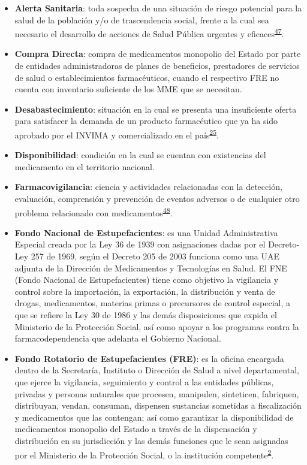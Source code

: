 \documentclass[
]{book}
\begin{document}
\begin{itemize}
\item
  \textbf{Alerta Sanitaria}: toda sospecha de una situación de riesgo potencial para la salud de la población y/o de trascendencia social, frente a la cual sea necesario el desarrollo de acciones de Salud Pública urgentes y eficaces\textsuperscript{\protect\hyperlink{ref-INVIMA2021-ALERTAS}{47}}.
\item
  \textbf{Compra Directa}: compra de medicamentos monopolio del Estado por parte de entidades administradoras de planes de beneficios, prestadores de servicios de salud o establecimientos farmacéuticos, cuando el respectivo FRE no cuenta con inventario suficiente de los MME que se necesitan.
\item
  \textbf{Desabastecimiento}: situación en la cual se presenta una insuficiente oferta para satisfacer la demanda de un producto farmacéutico que ya ha sido aprobado por el INVIMA y comercializado en el país\textsuperscript{\protect\hyperlink{ref-INVIMA2018-Desabast}{25}}.
\item
  \textbf{Disponibilidad}: condición en la cual se cuentan con existencias del medicamento en el territorio nacional.
\item
  \textbf{Farmacovigilancia}: ciencia y actividades relacionadas con la detección, evaluación, comprensión y prevención de eventos adversos o de cualquier otro problema relacionado con medicamentos\textsuperscript{\protect\hyperlink{ref-INVIMA2006-FV}{48}}.
\item
  \textbf{Fondo Nacional de Estupefacientes}: es una Unidad Administrativa Especial creada por la Ley 36 de 1939 con asignaciones dadas por el Decreto-Ley 257 de 1969, según el Decreto 205 de 2003 funciona como una UAE adjunta de la Dirección de Medicamentos y Tecnologías en Salud. El FNE (Fondo Nacional de Estupefacientes) tiene como objetivo la vigilancia y control sobre la importación, la exportación, la distribución y venta de drogas, medicamentos, materias primas o precursores de control especial, a que se refiere la Ley 30 de 1986 y las demás disposiciones que expida el Ministerio de la Protección Social, así como apoyar a los programas contra la farmacodependencia que adelanta el Gobierno Nacional.
\item
  \textbf{Fondo Rotatorio de Estupefacientes (FRE)}: es la oficina encargada dentro de la Secretaría, Instituto o Dirección de Salud a nivel departamental, que ejerce la vigilancia, seguimiento y control a las entidades públicas, privadas y personas naturales que procesen, manipulen, sinteticen, fabriquen, distribuyan, vendan, consuman, dispensen sustancias sometidas a fiscalización y medicamentos que las contengan; así como garantizar la disponibilidad de medicamentos monopolio del Estado a través de la dispensación y distribución en su jurisdicción y las demás funciones que le sean asignadas por el Ministerio de la Protección Social, o la institución competente\textsuperscript{\protect\hyperlink{ref-MSPS1479-2006}{2}}.

\end{itemize}
\end{document}
